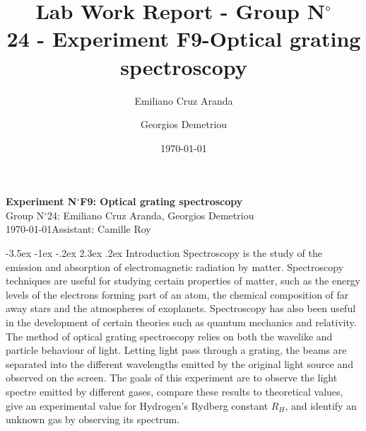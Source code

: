 \documentclass[a4paper, 12pt,oneside]{article}
\makeatletter
\renewcommand{\section}{\@startsection {section}{1}{\z@}%
             {-3.5ex \@plus -1ex \@minus -.2ex}%
             {2.3ex \@plus.2ex}%
             {\normalfont\normalsize\bfseries}}
\makeatother
\begin{document}
\title{\normalsize{Lab Work Report - Group N$^\circ$\\ 24 - Experiment F9-Optical grating spectroscopy}}
\date{\normalsize{\today}}
\author{\normalsize{Emiliano Cruz Aranda}\and \normalsize{Georgios Demetriou}}


\begin{center}
\large\textbf{\sffamily Experiment N$^\circ$F9: Optical grating spectroscopy}\\%
\large\sffamily Group N$^\circ$24: Emiliano Cruz Aranda, Georgios Demetriou\\%
\large\sffamily \today\qquad Assistant: Camille Roy\\%
\end{center}

\section{Introduction}
\vspace{-3mm}
Spectroscopy is the study of the emission and absorption of electromagnetic radiation by matter. Spectroscopy techniques are useful for studying certain properties of matter, such as the energy levels of the electrons forming part of an atom, the chemical composition of far away stars and the atmospheres of exoplanets. Spectroscopy has also been useful in the development of certain theories such as quantum mechanics and relativity\cite{Britannica}. The method of optical grating spectroscopy relies on both the wavelike and particle behaviour of light. Letting light pass through a grating, the beams are separated into the different wavelengths emitted by the original light source and observed on the screen. The goals of this experiment are to observe the light spectre emitted by different gases, compare these results to theoretical values, give an experimental value for Hydrogen's Rydberg constant $R_H$, and identify an unknown gas by observing its spectrum.
\end{document}
